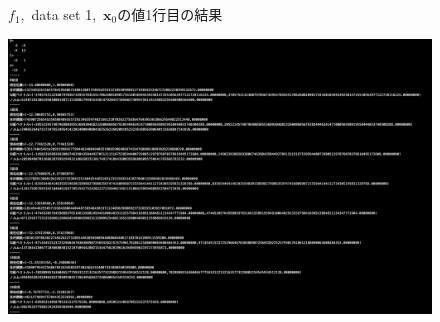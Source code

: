 \documentclass[12pt]{jarticle}
\begin{document}
\begin{figure}[h]
\begin{center}
    \end{center}
    \caption{$f_1$,\ data set 1,\ $\boldsymbol{x}_0$の値1行目の結果}
\end{figure}

\clearpage
\begin{figure}[h]
    \begin{center}
        \includegraphics[scale=0.2]{kadai1_1s_out1_2_1.png}
    \end{center}
    \begin{minipage}{0.5\hsize}
        \begin{center}

\end{center}
\end{minipage}
\end{figure}
\end{document}
